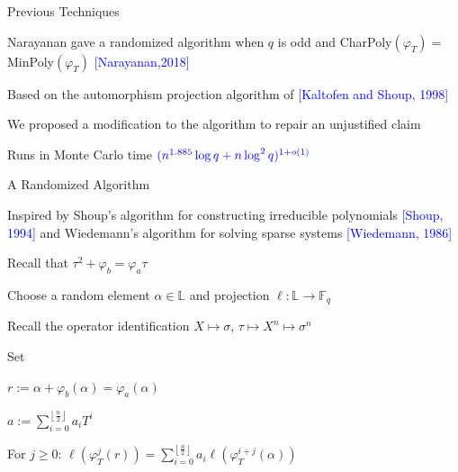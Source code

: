 \documentclass{beamer}
\newcommand{\f}{\mathbb{F}}
\newcommand{\blue}{\textcolor{blue}}
\newcommand{\spa}{\vspace{0.2cm}}
\newcommand{\spa}{\textnormal{ }}
\begin{document}

\begin{frame}{Previous Techniques}

Narayanan gave a randomized algorithm when $q$ is odd and  CharPoly$(\varphi_T) = $ MinPoly$(\varphi_T)$ \blue{[Narayanan,2018]}

\spa

Based on the automorphism projection algorithm of \blue{[Kaltofen and Shoup, 1998]}

\spa

We proposed a modification to the algorithm to repair an unjustified claim

\spa

Runs in Monte Carlo time $\blue{(n^{1.885} \log q + n \log^2 q)^{1+o(1)}}$
    
\end{frame}


\begin{frame}{A Randomized Algorithm}


     Inspired by Shoup's algorithm for constructing irreducible polynomials \blue{[Shoup, 1994]} and Wiedemann's algorithm for solving sparse systems \blue{[Wiedemann, 1986]}
     
     \spa
     
    \item Recall that $\tau^2 + \varphi_b = \varphi_a \tau$
    
    
    \item Choose a random element $\alpha \in \mathbb{L}$ and projection $\ell : \mathbb{L} \to \f_q$
    \item Recall the operator identification $X \mapsto \sigma$, $\tau \mapsto X^n \mapsto \sigma^n$
    \item Set
    \item \centerline{$r := \alpha + \varphi_b(\alpha) = \varphi_a(\alpha)$}
    \item \centerline{$a := \sum_{i=0}^{\left\lfloor \frac{n}{2} \right\rfloor}a_iT^i$}
    
    \item For $j \geq 0$: $\ell(\varphi_T^j(r)) = \sum_{i = 0}^{\left\lfloor{\frac{n}{2}} \right\rfloor}a_i\ell(\varphi_T^{i+j}(\alpha))$
 
    
    \end{frame}
    
\end{document}
